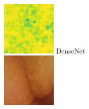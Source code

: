 \documentclass[conference]{IEEEtran}
\begin{document}
\begin{figure}[!t]
         \\
        \vfill
        \includegraphics[width=\linewidth]{Figures/983/983_densenet_ssim.jpg}
        DenseNet\\
    \endminipage\hfill
        \centering
        \includegraphics[width=\linewidth]{Figures/983/983_RCAN.jpg}

\end{figure}
\end{document}
